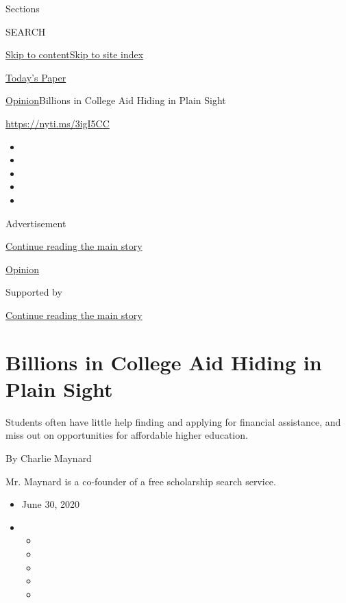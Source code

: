Sections

SEARCH

\protect\hyperlink{site-content}{Skip to
content}\protect\hyperlink{site-index}{Skip to site index}

\href{https://myaccount.nytimes3xbfgragh.onion/auth/login?response_type=cookie\&client_id=vi}{}

\href{https://www.nytimes3xbfgragh.onion/section/todayspaper}{Today's
Paper}

\href{/section/opinion}{Opinion}\textbar{}Billions in College Aid Hiding
in Plain Sight

\url{https://nyti.ms/3igI5CC}

\begin{itemize}
\item
\item
\item
\item
\item
\end{itemize}

Advertisement

\protect\hyperlink{after-top}{Continue reading the main story}

\href{/section/opinion}{Opinion}

Supported by

\protect\hyperlink{after-sponsor}{Continue reading the main story}

\hypertarget{billions-in-college-aid-hiding-in-plain-sight}{%
\section{Billions in College Aid Hiding in Plain
Sight}\label{billions-in-college-aid-hiding-in-plain-sight}}

Students often have little help finding and applying for financial
assistance, and miss out on opportunities for affordable higher
education.

By Charlie Maynard

Mr. Maynard is a co-founder of a free scholarship search service.

\begin{itemize}
\item
  June 30, 2020
\item
  \begin{itemize}
  \item
  \item
  \item
  \item
  \item
  \end{itemize}
\end{itemize}

